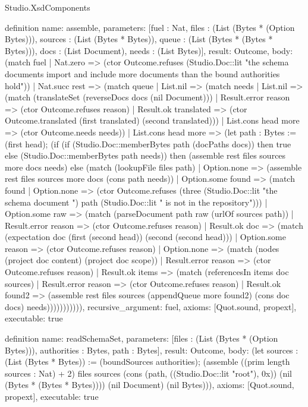 \begin{lexlean}{Studio.XsdComponents}
\begin{semanticmodule}
definition{
  name: assemble,
  parameters: [fuel : Nat, files : (List (Bytes * (Option Bytes))), sources : (List (Bytes * Bytes)), queue : (List (Bytes * (Bytes * Bytes))), docs : (List Document), needs : (List Bytes)],
  result: Outcome,
  body: (match fuel
    | Nat.zero => (ctor Outcome.refuses (Studio.Doc::lit "the schema documents import and include more documents than the bound authorities hold"))
    | Nat.succ rest => (match queue
      | List.nil => (match needs
        | List.nil => (match (translateSet (reverseDocs docs (nil Document)))
          | Result.error reason => (ctor Outcome.refuses reason)
          | Result.ok translated => (ctor Outcome.translated (first translated) (second translated)))
        | List.cons head more => (ctor Outcome.needs needs))
      | List.cons head more => (let path : Bytes := (first head); (if (if (Studio.Doc::memberBytes path (docPaths docs)) then true else (Studio.Doc::memberBytes path needs)) then (assemble rest files sources more docs needs) else (match (lookupFile files path)
        | Option.none => (assemble rest files sources more docs (cons path needs))
        | Option.some found => (match found
          | Option.none => (ctor Outcome.refuses (three (Studio.Doc::lit "the schema document ") path (Studio.Doc::lit " is not in the repository")))
          | Option.some raw => (match (parseDocument path raw (urlOf sources path))
            | Result.error reason => (ctor Outcome.refuses reason)
            | Result.ok doc => (match (expectation doc (first (second head)) (second (second head)))
              | Option.some reason => (ctor Outcome.refuses reason)
              | Option.none => (match (nodes (project doc content) (project doc scope))
                | Result.error reason => (ctor Outcome.refuses reason)
                | Result.ok items => (match (referencesIn items doc sources)
                  | Result.error reason => (ctor Outcome.refuses reason)
                  | Result.ok found2 => (assemble rest files sources (appendQueue more found2) (cons doc docs) needs))))))))))),
  recursive_argument: fuel,
  axioms: [Quot.sound, propext],
  executable: true
}

definition{
  name: readSchemaSet,
  parameters: [files : (List (Bytes * (Option Bytes))), authorities : Bytes, path : Bytes],
  result: Outcome,
  body: (let sources : (List (Bytes * Bytes)) := (boundSources authorities); (assemble ((prim length sources : Nat) + 2) files sources (cons (path, ((Studio.Doc::lit "root"), 0x)) (nil (Bytes * (Bytes * Bytes)))) (nil Document) (nil Bytes))),
  axioms: [Quot.sound, propext],
  executable: true
}
\end{semanticmodule}
\end{lexlean}

